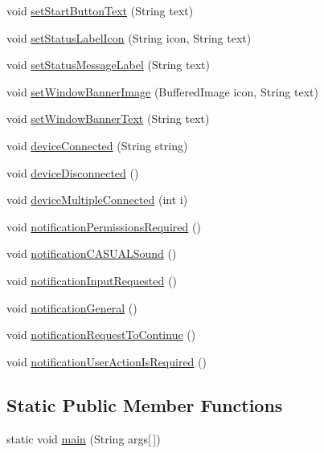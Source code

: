 \begin{DoxyCompactItemize}
void \hyperlink{classCASCADEGUI_1_1CASCADEGUI_a4ac6e6fe72d4de88c0ea75c92b9ef6e7}{set\-Start\-Button\-Text} (String text)
\item 
void \hyperlink{classCASCADEGUI_1_1CASCADEGUI_ab81a942be6a431984e2b8a3c64fa721b}{set\-Status\-Label\-Icon} (String icon, String text)
\item 
void \hyperlink{classCASCADEGUI_1_1CASCADEGUI_a85d7babb514ed1c760779538fcb666a9}{set\-Status\-Message\-Label} (String text)
\item 
void \hyperlink{classCASCADEGUI_1_1CASCADEGUI_a824ff8fb59f84bc3f048f0288796d75e}{set\-Window\-Banner\-Image} (Buffered\-Image icon, String text)
\item 
void \hyperlink{classCASCADEGUI_1_1CASCADEGUI_a80c9fe66dd68d134dc13759c2a757d74}{set\-Window\-Banner\-Text} (String text)
\item 
void \hyperlink{classCASCADEGUI_1_1CASCADEGUI_a82d1be792b2be3a60e57fd7dd67a1900}{device\-Connected} (String string)
\item 
void \hyperlink{classCASCADEGUI_1_1CASCADEGUI_a3aed3d6c9d77c7ca52f07137ce41f2a6}{device\-Disconnected} ()
\item 
void \hyperlink{classCASCADEGUI_1_1CASCADEGUI_a7be4ced04beac7bf4439daa7d0ba8e16}{device\-Multiple\-Connected} (int i)
\item 
void \hyperlink{classCASCADEGUI_1_1CASCADEGUI_ab0416903e989b65c33122f4ec0c31523}{notification\-Permissions\-Required} ()
\item 
void \hyperlink{classCASCADEGUI_1_1CASCADEGUI_ab626397400af7582d19e7200daba1678}{notification\-C\-A\-S\-U\-A\-L\-Sound} ()
\item 
void \hyperlink{classCASCADEGUI_1_1CASCADEGUI_a39f374e0ad4f250b0018ad111f59c1d9}{notification\-Input\-Requested} ()
\item 
void \hyperlink{classCASCADEGUI_1_1CASCADEGUI_a00033dc3bbee0c1cc56930758e951b99}{notification\-General} ()
\item 
void \hyperlink{classCASCADEGUI_1_1CASCADEGUI_a814bf0111d304835ec958df02ad61da3}{notification\-Request\-To\-Continue} ()
\item 
void \hyperlink{classCASCADEGUI_1_1CASCADEGUI_aba49e61e74bc16729356ec7199e9b4be}{notification\-User\-Action\-Is\-Required} ()
\end{DoxyCompactItemize}
\subsection*{Static Public Member Functions}
\begin{DoxyCompactItemize}
\item 
static void \hyperlink{classCASCADEGUI_1_1CASCADEGUI_af82107291a3a50f50dc71a827183d741}{main} (String args\mbox{[}$\,$\mbox{]})
\end{DoxyCompactItemize}


